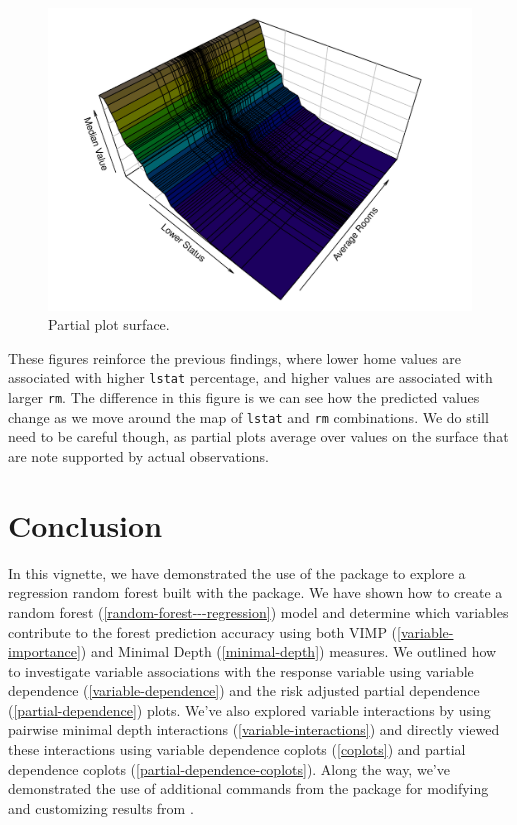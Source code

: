 \documentclass[article]{jss}
\begin{document}
\begin{CodeChunk}
\begin{figure}

{\centering \includegraphics{Regression-rfsrc_files/figure-latex/surface3d-1} 

}

\caption[Partial plot surface]{Partial plot surface.}\label{fig:surface3d}
\end{figure}
\end{CodeChunk}

These figures reinforce the previous findings, where lower home values
are associated with higher \texttt{lstat} percentage, and higher values
are associated with larger \texttt{rm}. The difference in this figure is
we can see how the predicted values change as we move around the map of
\texttt{lstat} and \texttt{rm} combinations. We do still need to be
careful though, as partial plots average over values on the surface that
are note supported by actual observations.

\section{Conclusion}\label{conclusion}

In this vignette, we have demonstrated the use of the
 package to explore a regression random forest
built with the  package. We have shown how to
create a random forest (\autoref{random-forest---regression}) model and
determine which variables contribute to the forest prediction accuracy
using both VIMP (\autoref{variable-importance}) and Minimal Depth
(\autoref{minimal-depth}) measures. We outlined how to investigate
variable associations with the response variable using variable
dependence (\autoref{variable-dependence}) and the risk adjusted partial
dependence (\autoref{partial-dependence}) plots. We've also explored
variable interactions by using pairwise minimal depth interactions
(\autoref{variable-interactions}) and directly viewed these interactions
using variable dependence coplots (\autoref{coplots}) and partial
dependence coplots (\autoref{partial-dependence-coplots}). Along the
way, we've demonstrated the use of additional commands from the
 package for modifying and customizing results from
.

\renewcommand\refname{References}

\end{document}
